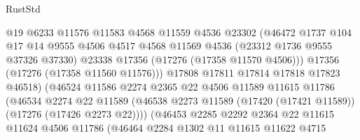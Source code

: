 \begin{lexlean}{RustStd}
\begin{coremodule}
                                @19
                                @6233
                                @11576
                                @11583
                                @4568
                                @11559
                                @4536
                                @23302
                                (@46472
                                  @1737
                                  @104
                                  @17
                                  @14
                                  @9555
                                  @4506
                                  @4517
                                  @4568
                                  @11569
                                  @4536
                                  (@23312 @1736 @9555 @37326 @37330)
                                  @23338
                                  @17356
                                  (@17276 (@17358 @11570 @4506)))
                                @17356
                                (@17276 (@17358 @11560 @11576)))
                              @17808
                              @17811
                              @17814
                              @17818
                              @17823
                              @46518)
                            (@46524
                              @11586
                              @2274
                              @2365
                              @22
                              @4506
                              @11589
                              @11615
                              @11786
                              (@46534
                                @2274
                                @22
                                @11589
                                (@46538
                                  @2273
                                  @11589
                                  (@17420 (@17421 @11589))
                                  (@17276 (@17426 @2273 @22))))
                              (@46453
                                @2285
                                @2292
                                @2364
                                @22
                                @11615
                                @11624
                                @4506
                                @11786
                                (@46464
                                  @2284
                                  @1302
                                  @11
                                  @11615
                                  @11622
                                  @4715

\end{coremodule}
\end{lexlean}
